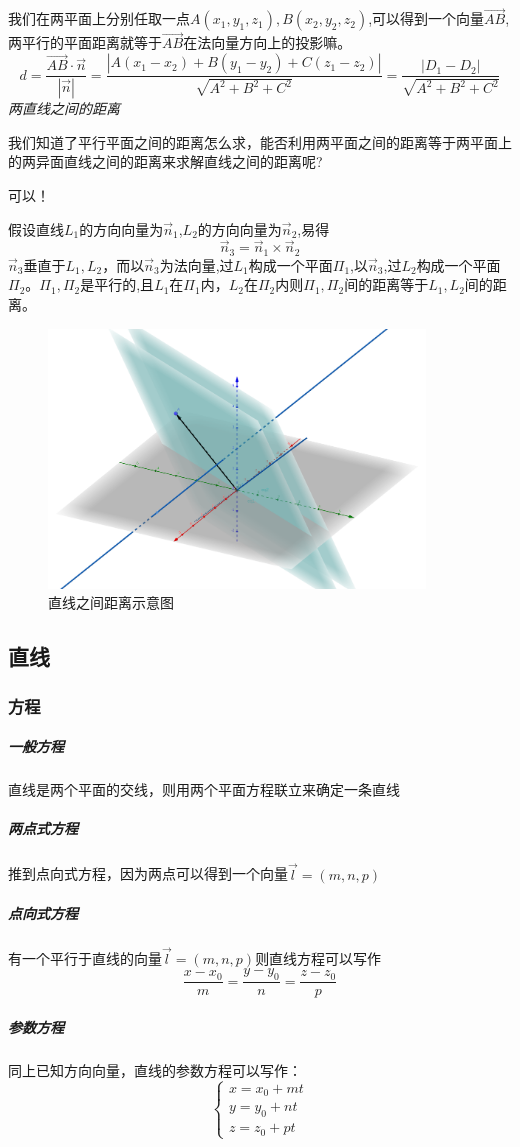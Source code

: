 \documentclass[UTF8]{ctexart}
\begin{document}
  我们在两平面上分别任取一点$A(x_1,y_1,z_1),B(x_2,y_2,z_2)$,可以得到一个向量$\vec{AB}$,两平行的平面距离就等于$\vec {AB}$在法向量方向上的投影嘛。
  $$d = \frac{\vec {AB} \cdot \vec n}{|\vec n|} = \frac{|A(x_1-x_2)+B(y_1-y_2)+C(z_1-z_2)|}{\sqrt{A^2+B^2+C^2}} = \frac{|D_1-D_2|}{\sqrt{A^2 + B^2 + C^2}}$$
\emph{两直线之间的距离}

我们知道了平行平面之间的距离怎么求，能否利用两平面之间的距离等于两平面上的两异面直线之间的距离来求解直线之间的距离呢?

可以！

假设直线$L_1$的方向向量为$\vec n_1$,$L_2$的方向向量为$\vec n_2$,易得
$$\vec n_3 = \vec n_1 \times \vec n_2$$
$\vec n_3$垂直于$L_1,L_2$，而以$\vec n_3$为法向量,过$L_1$构成一个平面$\Pi_1$,以$\vec n_3$,过$L_2$构成一个平面$\Pi_2$。$\Pi_1,\Pi_2$是平行的,且$L_1$在$\Pi_1$内，$L_2$在$\Pi_2$内则$\Pi_1,\Pi_2$间的距离等于$L_1,L_2$间的距离。
\begin{figure}[ht]
  \includegraphics[width = 10cm]{../picturenote/直线之间距离示意图.png}
  \caption{直线之间距离示意图}
  \label{直线之间距离}
\end{figure}

\subsection{直线}

\subsubsection{方程}
   \subparagraph{一般方程}直线是两个平面的交线，则用两个平面方程联立来确定一条直线
   \subparagraph{两点式方程}推到点向式方程，因为两点可以得到一个向量$\vec l = (m,n,p)$
   \subparagraph{点向式方程}有一个平行于直线的向量$\vec l = (m,n,p)$则直线方程可以写作
   $$\frac{x-x_0}{m}=\frac{y-y_0}{n}=\frac{z-z_0}{p}$$
   \subparagraph{参数方程}同上已知方向向量，直线的参数方程可以写作：
   $$\begin{cases}  {x = x_0 + mt}\\{y = y_0 + nt}\\z = z_0 + pt\end{cases}$$
\end{document}
